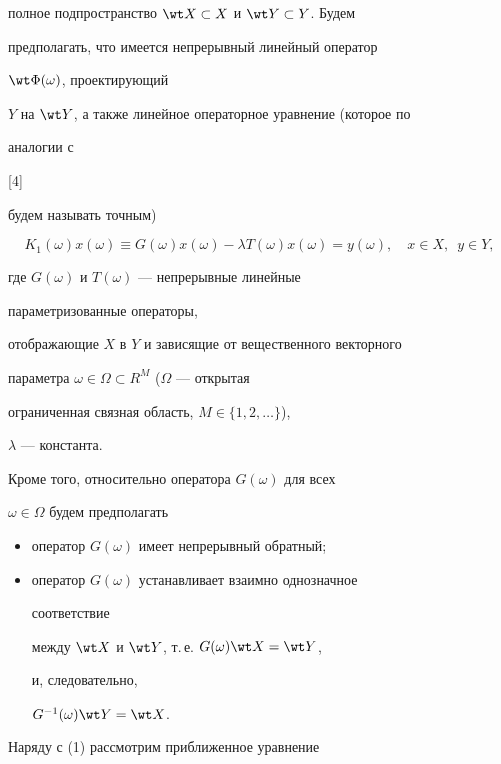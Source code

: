 полное подпространство $\wt X\subset X$ и $\wt Y\subset Y$. Будем


предполагать, что имеется непрерывный линейный оператор


$\wt\Phi(\omega)$, проектирующий


$Y$ на $\wt Y$, а также линейное операторное уравнение (которое по


аналогии с


[4]


будем называть точным)


\begin{equation}


K_1(\omega)x(\omega)\equiv G(\omega)x(\omega)-


\lambda T(\omega)x(\omega)=y(\omega),\quad x\in X,\ \; y\in Y,


\end{equation}


где $G(\omega)$ и $T(\omega)$ --- непрерывные линейные


параметризованные операторы,


отображающие $X$ в $Y$ и зависящие от вещественного векторного


параметра $\omega\in\Omega\subset R^M$ ($\Omega$ --- открытая


ограниченная связная область, $M\in\{1,2,\dotsc\}$),


$\lambda$ --- константа.





Кроме того, относительно оператора $G(\omega)$ для всех


$\omega\in\Omega$ будем предполагать


\begin{itemize}


\item[1)] оператор $G(\omega)$ имеет непрерывный обратный;


\item[2)] оператор $G(\omega)$ устанавливает взаимно однозначное


соответствие


между $\wt X$ и $\wt Y$, т.\,е. $G(\omega)\wt X=\wt Y$,


и, следовательно,


$G^{-1}(\omega)\wt Y=\wt X$.


\end{itemize}





Наряду с (1) рассмотрим приближенное уравнение


